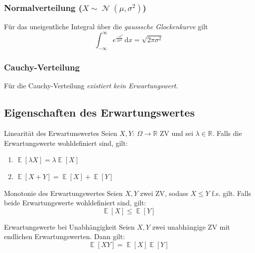 \documentclass[a4paper,10pt]{article}
\def\R{\mathbb{R}}
\DeclareMathOperator{\E}{\mathbb{E}}
\DeclareMathOperator{\Exp}{Exp}
\DeclareMathOperator{\normal}{\mathcal{N}}
\numberwithin{equation}{section}
\begin{document}

\subsubsection{Normalverteilung (\( X \sim \normal(\mu, \sigma^2) \))}

\begin{subbox}{}
    Für das uneigentliche Integral über die \emph{gausssche Glockenkurve} gilt
    \[
        \int_{-\infty}^\infty e^{\frac{-x^2}{2 \sigma^2}} \, \mathrm{d}x = \sqrt{2 \pi \sigma^2}
    \]
\end{subbox}

\subsubsection{Cauchy-Verteilung}
Für die Cauchy-Verteilung \emph{existiert kein Erwartungswert}.

\subsection{Eigenschaften des Erwartungswertes}

\begin{mainbox}{Linearität des Erwartunswertes}
    Seien \( X, Y: \: \Omega \to \R \) ZV und sei \( \lambda \in \R \). Falls die Erwartungswerte wohldefiniert sind, gilt:
    \begin{enumerate}
        \item \( \E[\lambda X] = \lambda \E[X] \)
        \item \( \E[X + Y] = \E[X] + \E[Y] \)
    \end{enumerate}
\end{mainbox}

\begin{mainbox}{Monotonie des Erwartungswertes}
    Seien \( X, Y \) zwei ZV, sodass \( X \leq Y \) f.s. gilt. Falls beide Erwartungswerte wohldefiniert sind, gilt:
    \[
        \E[X] \leq \E[Y]
    \]
\end{mainbox}

\begin{mainbox}{Erwartungswerte bei Unabhängigkeit}
    Seien \( X, Y \) zwei unabhängige ZV mit endlichen Erwartungswerten. Dann gilt:
    \[
        \E[XY] = \E[X] \E[Y]
    \]
\end{mainbox}
\end{document}
